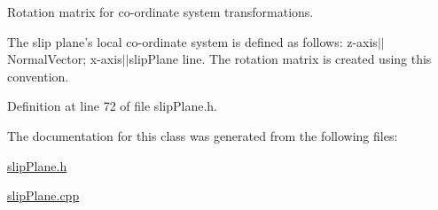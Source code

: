 Rotation matrix for co-\/ordinate system transformations. 

The slip plane's local co-\/ordinate system is defined as follows\-: z-\/axis$|$$|$\-Normal\-Vector; x-\/axis$|$$|$slip\-Plane line. The rotation matrix is created using this convention. 

Definition at line 72 of file slip\-Plane.\-h.



The documentation for this class was generated from the following files\-:\begin{DoxyCompactItemize}
\item 
\hyperlink{slipPlane_8h}{slip\-Plane.\-h}\item 
\hyperlink{slipPlane_8cpp}{slip\-Plane.\-cpp}\end{DoxyCompactItemize}

